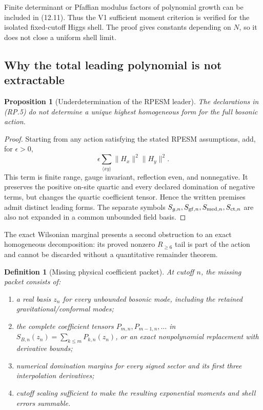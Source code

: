 \documentclass[11pt]{article}
\newtheorem{proposition}[theorem]{Proposition}
\newtheorem{definition}[theorem]{Definition}
\theoremstyle{remark}
\begin{document}
Finite determinant or Pfaffian modulus factors of polynomial growth
can be included in (12.11).  Thus the V1 sufficient moment
criterion is verified for the isolated fixed-cutoff Higgs shell.
The proof gives constants depending on \(N\), so it does not close a
uniform shell limit.

\subsection{Why the total leading polynomial is not extractable}

\begin{proposition}[Underdetermination of the RPESM leader]
\label{prop:v17v12-underdetermined}
The declarations in \textup{(RP.5)} do not determine a unique
highest homogeneous form for the full bosonic action.
\end{proposition}

\begin{proof}
Starting from any action satisfying the stated RPESM assumptions,
add, for \(\epsilon>0\),
\[
 \epsilon\sum_{\langle xy\rangle}
 \|H_x\|^2\|H_y\|^2.                               \tag{12.12}
\]
This term is finite range, gauge invariant, reflection even, and
nonnegative.  It preserves the positive on-site quartic and every
declared domination of negative terms, but changes the quartic
coefficient tensor.  Hence the written premises admit distinct
leading forms.  The separate symbols
\(S_{g,n},S_{{\rm gf},n},S_{{\rm med},n},S_{{\rm ct},n}\) are also
not expanded in a common unbounded field basis.
\end{proof}

The exact Wilsonian marginal presents a second obstruction to an
exact homogeneous decomposition: its proved nonzero
\(R_{\geq6}\) tail is part of the action and cannot be discarded
without a quantitative remainder theorem.

\begin{definition}[Missing physical coefficient packet]
\label{def:v17v12-missing-packet}
At cutoff \(n\), the missing packet consists of:
\begin{enumerate}
\item a real basis \(z_n\) for every unbounded bosonic mode,
      including the retained gravitational/conformal modes;
\item the complete coefficient tensors
      \(P_{m,n},P_{m-1,n},\ldots\) in
      \(S_{B,n}(z_n)=\sum_{k\leq m}P_{k,n}(z_n)\), or an exact
      nonpolynomial replacement with derivative bounds;
\item numerical domination margins for every signed sector and
      its first three interpolation derivatives;
\item cutoff scaling sufficient to make the resulting exponential
      moments and shell errors summable.
\end{enumerate}
\end{definition}
\end{document}
